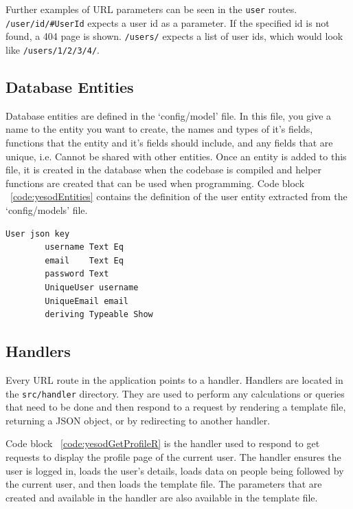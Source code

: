 Further examples of URL parameters can be seen in the \texttt{user} routes. 
\texttt{/user/id/\#UserId} expects a user id as a parameter. If the specified
id is not found, a 404 page is shown. \texttt{/users/\*[UserId]} expects a list
of user ids, which would look like \texttt{/users/1/2/3/4/}.

\subsection{Database Entities}

Database entities are defined in the `config/model' file. In this file, you
give a name to the entity you want to create, the names and types of it's
fields, functions that the entity and it's fields should include, and
any fields that are unique, i.e. Cannot be shared with other entities.
Once an entity is added to this file, it is created in the database
when the codebase is compiled and helper functions are created that
can be used when programming. Code block ~\ref{code:yesodEntities} contains
the definition of the user entity extracted from the `config/models' file.

\begin{lstlisting}[caption={Yesod Database Entities},label={code:yesodEntities}]
	User json key
		username Text Eq
		email    Text Eq
		password Text
		UniqueUser username
		UniqueEmail email
		deriving Typeable Show
\end{lstlisting}

\subsection{Handlers}

Every URL route in the application points to a handler. Handlers are located in
the \texttt{src/handler} directory. They are used to perform any calculations or queries 
that need to be done and then respond to a request by rendering a template file, 
returning a JSON object, or by redirecting to another handler.

Code block ~\ref{code:yesodGetProfileR} is the handler used to respond to get requests
to display the profile page of the current user. The handler ensures the user is logged in,
loads the user's details, loads data on people being followed by the current user,
and then loads the template file. The parameters that are created and available
in the handler are also available in the template file.


